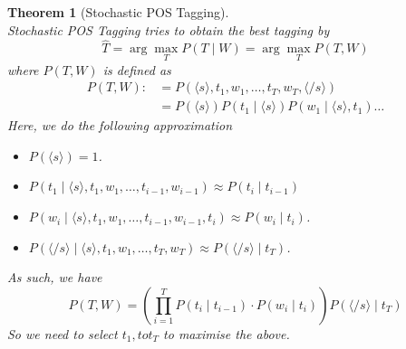 \documentclass[12pt]{article}
\newtheorem{theorem}{Theorem}[section]
\theoremstyle{definition}
\begin{document}
\begin{theorem}[Stochastic POS Tagging]
\hfill\\\normalfont Stochastic POS Tagging tries to obtain the best tagging by
\[
\hat{T} = \arg\max_T P(T\mid W) = \arg\max_T P(T,W)
\]
where $P(T,W)$ is defined as
\begin{align*}
P(T,W):&=P(\langle s\rangle, t_1, w_1,\ldots, t_T, w_T, \langle/s\rangle)\\
&=P(\langle s\rangle) P(t_1\mid \langle s\rangle ) P(w_1\mid \langle s\rangle, t_1) \ldots
\end{align*}
Here, we do the following approximation
\begin{itemize}
	\item $P(\langle s\rangle) = 1$.
	\item $P(t_1\mid \langle s\rangle, t_1, w_1, \ldots, t_{i-1}, w_{i-1}) \approx P(t_i\mid t_{i-1})$
	\item $P(w_i\mid \langle s\rangle, t_1, w_1, \ldots, t_{i-1}, w_{i-1}, t_i)\approx P(w_i\mid t_i)$.
	\item $P(\langle /s\rangle\mid \langle s\rangle, t_1, w_1, \ldots, t_T, w_T) \approx P(\langle /s\rangle\mid t_T)$.
\end{itemize}
As such, we have
\[
P(T,W)=(\prod_{i=1}^T P(t_i\mid t_{i-1})\cdot P(w_i\mid t_i))P(\langle /s\rangle\mid t_T)
\]
So we need to select $t_1, to t_T$ to maximise the above.
\end{theorem}
\end{document}
